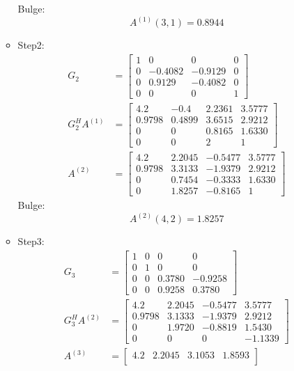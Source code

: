 \documentclass[english,onecolumn]{IEEEtran}
\begin{document}
\begin{enumerate}
\begin{itemize}
     		Bulge:
     		$$A^{(1)}(3,1) = 0.8944$$
     	\item Step2:
		 \begin{align*}
     		G_2 &= \begin{bmatrix}
     			1 & 0 & 0 & 0\\
     			0 & -0.4082 & -0.9129 & 0\\
     			0 & 0.9129 & -0.4082 & 0\\
     			0 & 0 & 0 & 1
     		\end{bmatrix}\\
     		G_2^H A^{(1)} & = \begin{bmatrix}
     			4.2 & -0.4 & 2.2361 & 3.5777\\
     			0.9798 & 0.4899 & 3.6515 & 2.9212 \\
     			0 & 0 & 0.8165 & 1.6330\\
     			0 & 0 & 2 & 1
     		\end{bmatrix}\\
     		A^{(2)} &= \begin{bmatrix}
     			4.2 & 2.2045 & -0.5477 & 3.5777 \\
     			0.9798 & 3.3133 & -1.9379 & 2.9212\\
     			0 & 0.7454 & -0.3333 & 1.6330\\
     			0 & 1.8257 & -0.8165 & 1
     		\end{bmatrix}
     	\end{align*}
     	Bulge:
     	$$A^{(2)}(4,2) = 1.8257$$
     \item Step3:
     \begin{align*}
     	G_3 &= \begin{bmatrix}
     		1 & 0 & 0 & 0\\
     		0 & 1 & 0 & 0\\
     		0 & 0 & 0.3780 & -0.9258\\
     		0 & 0 & 0.9258 & 0.3780
     	\end{bmatrix}\\
     	G_3^HA^{(2)} &= \begin{bmatrix}
     			4.2 & 2.2045 & -0.5477 & 3.5777 \\
     			0.9798 & 3.1333 & -1.9379 & 2.9212\\
     			0 & 1.9720 & -0.8819 & 1.5430\\
     			0 & 0  & 0 & -1.1339
     	\end{bmatrix}\\
     	A^{(3)} &= \begin{bmatrix}
     			4.2 & 2.2045 & 3.1053 & 1.8593 \\

\end{bmatrix}
\end{align*}
\end{itemize}
\end{enumerate}
\end{document}
